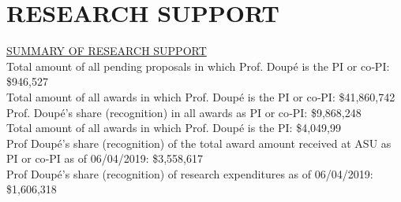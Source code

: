 \documentclass[11pt,letterpaper,sans]{moderncv}
\begin{document}


\section{RESEARCH SUPPORT}

\begin{framed}
  \underline{SUMMARY OF RESEARCH SUPPORT} \\
  Total amount of all pending proposals in which Prof. Doup\'e is the PI or co‐PI: \$946,527 \\
  Total amount of all awards in which Prof. Doup\'e is the PI or co‐PI: \$41,860,742  \\
  Prof. Doup\'e's share (recognition) in all awards as PI or co‐PI: \$9,868,248  \\
  Total amount of all awards in which Prof. Doup\'e is the PI: \$4,049,99  \\
  Prof Doup\'e's share (recognition) of the total award amount received at ASU as PI or co‐PI as of 06/04/2019: \$3,558,617 \\
  Prof Doup\'e's share (recognition) of research expenditures as of 06/04/2019: \$1,606,318 \\
\end{framed}
\end{document}
